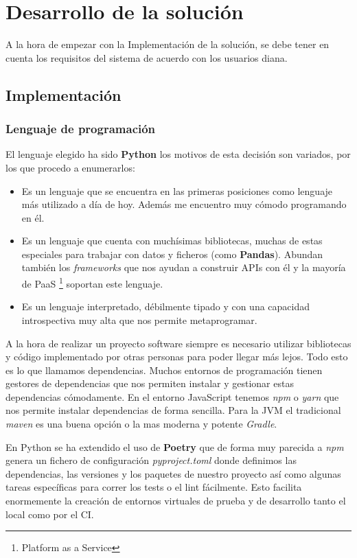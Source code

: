 \chapter{Desarrollo de la solución}
A la hora de empezar con la Implementación de la solución, se debe tener en cuenta los requisitos del sistema de acuerdo con los usuarios diana.



\section{Implementación}
\subsection{Lenguaje de programación}
El lenguaje elegido ha sido \textbf{Python} los motivos de esta decisión son variados, por los que procedo a enumerarlos:
\begin{itemize}
    \item Es un lenguaje que se encuentra en las \cite{tiobe} primeras posiciones como lenguaje más utilizado a día de hoy. Además me encuentro muy cómodo programando en él.
    \item Es un lenguaje que cuenta con muchísimas bibliotecas, muchas de estas especiales para trabajar con datos y ficheros (como \textbf{Pandas}). Abundan también los \textit{frameworks} que nos ayudan a construir APIs con él y la mayoría de PaaS \footnote{Platform as a Service} soportan este lenguaje.
    \item Es un lenguaje interpretado, débilmente tipado y con una capacidad introspectiva muy alta que nos permite metaprogramar.
\end{itemize}

A la hora de realizar un proyecto software siempre es necesario utilizar bibliotecas y código implementado por otras personas para poder llegar más lejos. Todo esto es lo que llamamos dependencias. Muchos entornos de programación tienen gestores de dependencias que nos permiten instalar y gestionar estas dependencias cómodamente. En el entorno JavaScript tenemos \textit{npm} o \textit{yarn} que nos permite instalar dependencias de forma sencilla. Para la JVM el tradicional \textit{maven} es una buena opción o la mas moderna y potente \textit{Gradle}.

En Python se ha extendido el uso de \textbf{Poetry} que de forma muy parecida a \textit{npm} genera un fichero de configuración \textit{pyproject.toml} donde definimos las dependencias, las versiones y los paquetes de nuestro proyecto así como algunas tareas específicas para correr los tests o el lint fácilmente. Esto facilita enormemente la creación de entornos virtuales de prueba y de desarrollo tanto el local como por el CI.

